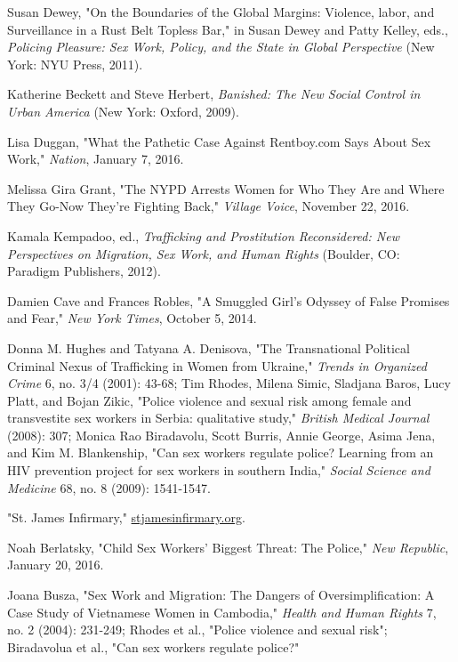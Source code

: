 \documentclass[fontset=fandol, a4paper, 12pt, openright]{ctexbook}
\begin{document}
\begin{enumerate}[label={[\arabic*]}]
    \item Susan Dewey, "On the Boundaries of the Global Margins: Violence, labor, and Surveillance in a Rust Belt Topless Bar," in Susan Dewey and Patty Kelley, eds., \textit{Policing Pleasure: Sex Work, Policy, and the State in Global Perspective} (New York: NYU Press, 2011).
    \item Katherine Beckett and Steve Herbert, \textit{Banished: The New Social Control in Urban America} (New York: Oxford, 2009).
    \item Lisa Duggan, "What the Pathetic Case Against Rentboy.com Says About Sex Work," \textit{Nation}, January 7, 2016.
    \item Melissa Gira Grant, "The NYPD Arrests Women for Who They Are and Where They Go-Now They're Fighting Back," \textit{Village Voice}, November 22, 2016.
    \item Kamala Kempadoo, ed., \textit{Trafficking and Prostitution Reconsidered: New Perspectives on Migration, Sex Work, and Human Rights} (Boulder, CO: Paradigm Publishers, 2012).
    \item Damien Cave and Frances Robles, "A Smuggled Girl's Odyssey of False Promises and Fear," \textit{New York Times}, October 5, 2014.
    \item Donna M. Hughes and Tatyana A. Denisova, "The Transnational Political Criminal Nexus of Trafficking in Women from Ukraine," \textit{Trends in Organized Crime} 6, no. 3/4 (2001): 43-68; Tim Rhodes, Milena Simic, Sladjana Baros, Lucy Platt, and Bojan Zikic, "Police violence and sexual risk among female and transvestite sex workers in Serbia: qualitative study," \textit{British Medical Journal} (2008): 307; Monica Rao Biradavolu, Scott Burris, Annie George, Asima Jena, and Kim M. Blankenship, "Can sex workers regulate police? Learning from an HIV prevention project for sex workers in southern India," \textit{Social Science and Medicine} 68, no. 8 (2009): 1541-1547.
    \item "St. James Infirmary," \url{stjamesinfirmary.org}.
    \item Noah Berlatsky, "Child Sex Workers’ Biggest Threat: The Police," \textit{New Republic}, January 20, 2016.
    \item Joana Busza, "Sex Work and Migration: The Dangers of Oversimplification: A Case Study of Vietnamese Women in Cambodia," \textit{Health and Human Rights} 7, no. 2 (2004): 231-249; Rhodes et al., "Police violence and sexual risk"; Biradavolua et al., "Can sex workers regulate police?"

\end{enumerate}
\end{document}

